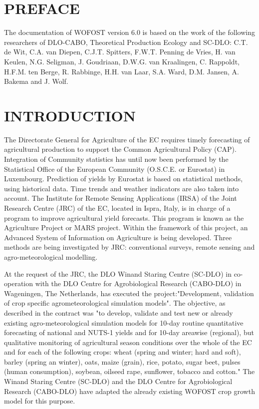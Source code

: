 
\chapter*{PREFACE}

The documentation of WOFOST version 6.0 is based on the work of the following
researchers of DLO-CABO, Theoretical Production Ecology and SC-DLO: C.T. de
Wit, C.A. van Diepen, C.J.T. Spitters, F.W.T. Penning de Vries, H. van Keulen, N.G.
Seligman, J. Goudriaan, D.W.G. van Kraalingen, C. Rappoldt, H.F.M. ten Berge, R.
Rabbinge, H.H. van Laar, S.A. Ward, D.M. Jansen, A. Bakema and J. Wolf.
\newpage

\chapter*{INTRODUCTION}

The Directorate General for Agriculture of the EC requires timely forecasting of
agricultural production to support the Common Agricultural Policy (CAP). 
Integra\-tion of Community statistics has until now been performed by the Statistical Office of
the European Community (O.S.C.E. or Eurostat) in Luxembourg. Prediction of yields
by Eurostat is based on statistical methods, using historical data. Time trends and
weather indicators are also taken into account. The Institute for Remote Sensing
Applications (IRSA) of the Joint Research Centre (JRC) of the EC, located in Ispra,
Italy, is in charge of a program to improve agricultural yield forecasts. This program
is known as the Agriculture Project or MARS project. Within the framework of this
project, an Advanced System of Information on Agriculture is being developed. Three
methods are being investigated by JRC: conventional surveys, remote sensing and
agro-meteorological modelling.

At the request of the JRC, the DLO Winand Staring Centre (SC-DLO) in co-operation with the 
DLO Centre for Agrobiological Research (CABO-DLO) in
Wageningen, The Nether\-lands, has executed the project:"Development, validation of
crop specific agrometeorological simulation models". The objective, as described in
the contract was "to develop, validate and test new or already existing agro-meteoro\-logical simulation models for 10-day routine quantitative forecasting of national and
NUTS-1 yields  and for 10-day areawise (regional), but qualitative monitoring of
agricultural season conditions over the whole of the EC and for each of the following
crops: wheat (spring and winter; hard and soft), barley (spring an winter), oats, maize
(grain), rice, potato, sugar beet, pulses (human consumption), soybean, oilseed rape,
sunflower, tobacco and cotton."  The Winand Staring Centre (SC-DLO) and the DLO
Centre for Agrobiological Research (CABO-DLO) have adapted the already existing
WOFOST crop growth model for this purpose.

